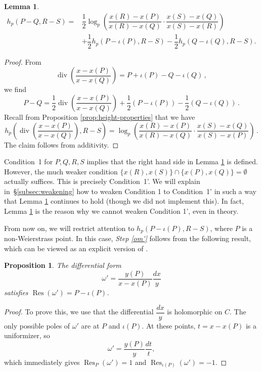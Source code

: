 \documentclass[11pt, a4paper]{amsart}
\newcommand{\dv}{\operatorname{div}}
\newcommand{\Res}{\operatorname{Res}}
\newtheorem{proposition}[theorem]{Proposition}
\newtheorem{lemma}[theorem]{Lemma}
\theoremstyle{remark}
\numberwithin{equation}{section}
\newcommand{\sg}{{}}
\newcommand{\sm}{{}}
\begin{document}
\begin{lemma}\label{L:symm-antisymm}
\begin{align*} 
  h_p(P-Q,R-S) = &\dfrac{1}{2}\log_p\left(\dfrac{x(R)-x(P)}{x(R)-x(Q)}\cdot \dfrac{x(S)-x(Q)}{x(S)-x(R)}\right)\\ 
  &+ \dfrac{1}{2}h_p(P-\iota(P),R-S)-\dfrac{1}{2}h_p(Q-\iota(Q),R-S).
\end{align*}
\end{lemma}
\begin{proof}
From 
\[
\dv\left(\dfrac{x-x(P)}{x-x(Q)}\right)=P+\iota(P)-Q-\iota(Q)\,,
\]
we find
\[
P-Q=\dfrac{1}{2}\dv\left(\dfrac{x-x(P)}{x-x(Q)}\right)+\dfrac{1}{2}(P-\iota(P))-\dfrac{1}{2}(Q-\iota(Q))\,.
\]
Recall from Proposition \ref{prop:height-properties} that we have 
\[
h_p\left(\dv\left(\dfrac{x-x(P)}{x-x(Q)}\right),
  R-S\right)=\log_p\left(\dfrac{x(R)-x(P)}{x(R)-x(Q)}\cdot \dfrac{x(S)-x(Q)}{x(S)-x(P)}\right)\,.
\]
The claim follows from additivity. 
\end{proof}
Condition~1 for  $P,Q,R,S$ implies that the right hand side in
Lemma \ref{L:symm-antisymm} is defined. 
 However, the much weaker condition $\{x(R),x(S)\}\cap \{x(P), x(Q)\} =
\emptyset$ actually suffices. This is precisely Condition~1'. We will explain in~\S\ref{subsec:weakening} how to
weaken Condition 1 to Condition~1' in such a way that
Lemma \ref{L:symm-antisymm} continues to hold (though we did not implement
this). 
\sm{In fact, Lemma \ref{L:symm-antisymm} is the reason why we cannot weaken Condition
1', even in theory. }


From now on, we will restrict attention to $h_p(P-\iota(P), R-S)$,
where $P$ is a non-Weierstrass point.
In this case, {\it Step \eqref{om'}}  follows from the following result,
which can be viewed as an explicit version of \cite[Proposition
5.13]{BBHeights}.
\begin{proposition}\label{prop:antisymmetric-residue-differential}
The differential form 
$$\omega'=\dfrac{y(P)}{x-x(P)}\dfrac{dx}{y}$$ 
satisfies $\Res(\omega')=P-\iota(P)$.
\end{proposition}

\begin{proof}
To prove this, we use that the differential $\dfrac{dx}{y}$ is holomorphic on $C$. The only possible poles of $\omega'$ are at $P$ and $\iota(P)$. 
At these points, $t=x-x(P)$ is a uniformizer, so
$$\omega'=\dfrac{y(P)}{y}\dfrac{dt}{t},$$
which immediately gives $\Res_P(\omega')=1$ and $\Res_{\iota(P)}(\omega')=-1$.
\end{proof}
\end{document}
